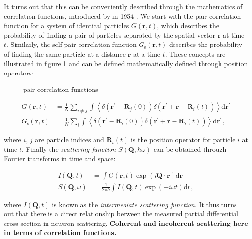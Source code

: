 It turns out that this can be conveniently described through the mathematics of correlation functions, introduced by \citeauthor{VanHove1954} in 1954 \cite{VanHove1954}. We start with the pair-correlation function for a system of identical particles $G(\bm{r}, t)$, which describes the probability of finding a pair of particles separated by the spatial vector $\bm{r}$ at time $t$. Similarly, the self pair-correlation function $G_\text{s}(\bm{r}, t)$ describes the probability of finding the same particle at a distance $\bm{r}$ at a time $t$. These concepts are illustrated in figure \ref{fig:correlation_functions} and can be defined mathematically defined through position operators:

\begin{figure}
	\centering
	\caption[pair correlation functions]{pair correlation functions}
	\label{fig:correlation_functions}
\end{figure}

\begin{align*}
	G(\bm{r}, t) &= \frac{1}{N} \sum_{i \neq j} \int \left\langle  \delta (\bm{r}^\prime - \bm{R}_j(0) ) \delta (\bm{r}^\prime + \bm{r} - \bm{R}_i(t)) \right\rangle \mathrm{d}\bm{r}^\prime \\
	G_\text{s}(\bm{r}, t) &= \frac{1}{N} \sum_{i} \int \left\langle  \delta (\bm{r}^\prime - \bm{R}_i(0) ) \delta (\bm{r}^\prime + \bm{r} - \bm{R}_i(t)) \right\rangle \mathrm{d}\bm{r}^\prime \, ,
\end{align*}

\noindent where $i$, $j$ are particle indices and $\bm{R}_i(t)$ is the position operator for particle $i$ at time $t$. Finally the \emph{scattering function} $S(\bm{Q}, \hbar\omega)$ can be obtained through Fourier transforms in time and space:

\begin{align*}
	I(\bm{Q}, t) &= \int G(\bm{r},t) \exp (i \bm{Q} \cdot \bm{r} ) \mathrm{d}\bm{r} \\
	S(\bm{Q}, \omega) &= \frac{1}{2 \pi \hbar} \int I(\bm{Q}, t) \exp (-i \omega t) \mathrm{d}t \, ,
\end{align*}

\noindent where $I(\bm{Q}, t)$ is known as the \emph{intermediate scattering function}. It thus turns out that there is a direct relationship between the measured partial differential cross-section in neutron scattering. \textbf{Coherent and incoherent scattering here in terms of correlation functions.}

